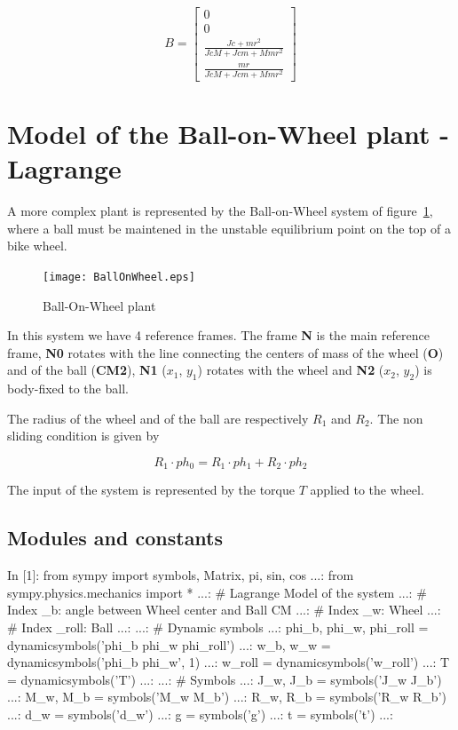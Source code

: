 $$
B=\left[\begin{matrix}0\\0\\\frac{Jc + m r^{2}}{Jc M + Jc m + M m 
r^{2}}\\\frac{m r}{Jc M + Jc m + M m r^{2}}\end{matrix}\right]
$$

\section{Model of the Ball-on-Wheel plant - Lagrange}

A more complex plant is represented by the Ball-on-Wheel system of 
figure~\ref{F9b}, where a ball must be maintened in the unstable equilibrium 
point on the top of a bike wheel.

\begin{figure}[htbp]	%
\centering
\texttt{[image: BallOnWheel.eps]}
\caption{Ball-On-Wheel plant}
\label{F9b}
\end{figure}

In this system we have 4 reference frames. The frame \textbf{N} is the main 
reference frame, \textbf{N0} rotates with the line connecting the centers of 
mass of the wheel (\textbf{O}) and of the ball (\textbf{CM2}), \textbf{N1} 
($x_1$, $y_1$) rotates with the wheel and \textbf{N2} ($x_2$, $y_2$) is 
body-fixed to the ball.

The radius of the wheel and of the ball are respectively $R_1$ and $R_2$. The 
non sliding condition is given by

$$
R_1 \cdot ph_0=R_1 \cdot ph_1 + R_2 \cdot ph_2
$$

The input of the system is represented by the torque $T$ applied to the wheel.

\subsection{Modules and constants}
\begin{code}
In [1]: from sympy import symbols, Matrix, pi, sin, cos
   ...: from sympy.physics.mechanics import *
   ...: # Lagrange Model of the system
   ...: # Index _b: angle between Wheel center and Ball CM
   ...: # Index _w: Wheel
   ...: # Index _roll: Ball
   ...: 
   ...: # Dynamic symbols
   ...: phi_b, phi_w, phi_roll = dynamicsymbols('phi_b phi_w phi_roll')
   ...: w_b, w_w = dynamicsymbols('phi_b phi_w', 1)
   ...: w_roll = dynamicsymbols('w_roll')
   ...: T = dynamicsymbols('T')
   ...: 
   ...: # Symbols
   ...: J_w, J_b = symbols('J_w J_b')
   ...: M_w, M_b = symbols('M_w M_b')
   ...: R_w, R_b = symbols('R_w R_b')
   ...: d_w     = symbols('d_w')
   ...: g      = symbols('g')
   ...: t      = symbols('t')
   ...: 
\end{code}

